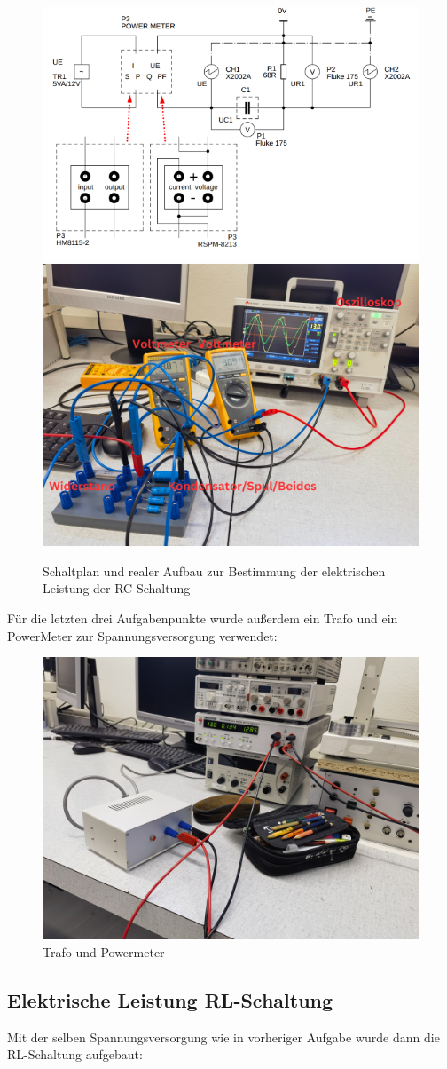 \documentclass[12pt,a4paper,twoside]{article}
\begin{document}
\begin{figure}[H]
    \centering
    \includegraphics[width=0.4\linewidth]{nudes/Schaltplan5.PNG}
    \includegraphics[width=0.4\linewidth]{nudes/PhaseLeistungBilder/Aufbau5,6,7.jpg}
    \caption{Schaltplan und realer Aufbau zur Bestimmung der elektrischen Leistung der RC-Schaltung}
    \label{fig:Aufbau5}
\end{figure}

Für die letzten drei Aufgabenpunkte wurde außerdem ein Trafo und ein PowerMeter zur Spannungsversorgung verwendet:

\begin{figure}[H]
    \centering
    \includegraphics[width=0.4\linewidth]{nudes/PhaseLeistungBilder/Trafo,Powermeter.jpg}
    \caption{Trafo und Powermeter}
    \label{fig:TrafoPowerMeter}
\end{figure}


\subsection{Elektrische Leistung RL-Schaltung}

Mit der selben Spannungsversorgung wie in vorheriger Aufgabe wurde dann die RL-Schaltung aufgebaut:
\end{document}
